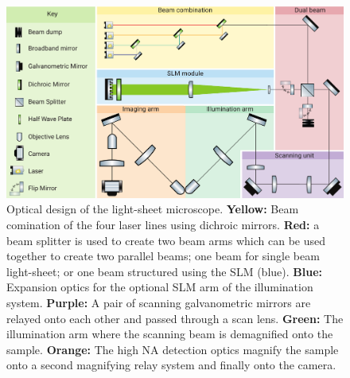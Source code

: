 \begin{landscape}
  \begin{figure}
  \centering
  \includegraphics[width=\linewidth]{./optical_design_colour}
  \caption[Full optical design of new \gls{light-sheet} microscope]{
  Optical design of the light-sheet microscope. \textbf{Yellow:} Beam comination of the four laser lines using dichroic mirrors.
  \textbf{Red:} a beam splitter is used to create two beam arms which can be used together to create two parallel beams; one beam for single beam light-sheet; or one beam structured using the SLM (blue).
  \textbf{Blue:} Expansion optics for the optional SLM arm of the illumination system.
  \textbf{Purple:} A pair of scanning galvanometric mirrors are relayed onto each other and passed through a scan lens.
  \textbf{Green:} The illumination arm where the scanning beam is demagnified onto the sample.
  \textbf{Orange:} The high NA detection optics magnify the sample onto a second magnifying relay system and finally onto the camera.
  }\label{fig:optical_design_colour}
  \end{figure}
\end{landscape}

